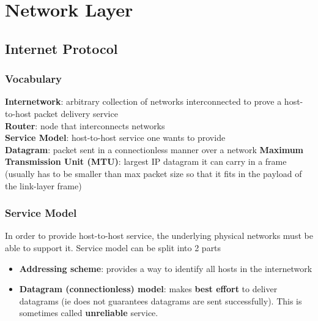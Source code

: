 \documentclass{article}
\begin{document}
  \section{Network Layer}
  \subsection{Internet Protocol}
  \subsubsection{Vocabulary}
  \textbf{Internetwork}: arbitrary collection of networks interconnected to prove a host-to-host packet delivery service \\ 
  \textbf{Router}: node that interconnects networks\\
  \textbf{Service Model}: host-to-host service one wants to provide \\
  \textbf{Datagram}: packet sent in a connectionless manner over a network
  \textbf{Maximum Transmission Unit (MTU)}: largest IP datagram it can carry in a frame (usually has to be smaller than max packet size so that it fits in the payload of the link-layer frame)
  \subsubsection{Service Model}
  In order to provide host-to-host service, the underlying physical networks must be able to support it. Service model can be split into 2 parts
  \begin{itemize}
    \item \textbf{Addressing scheme}: provides a way to identify all hosts in the internetwork
    \item \textbf{Datagram (connectionless) model}: makes \textbf{best effort} to deliver datagrams (ie does not guarantees datagrams are sent successfully). This is sometimes called \textbf{unreliable} service.
  \end{itemize}
\end{document}

